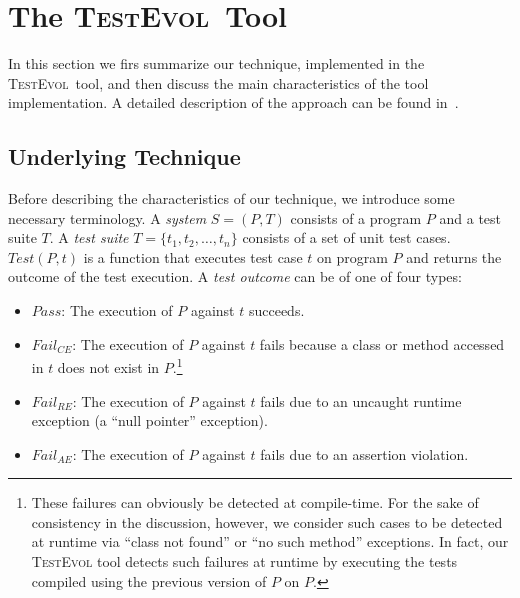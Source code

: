 \documentclass[conference]{IEEEtran}
\def\denseitems{
  \itemsep1pt plus1pt minus1pt
  \parsep0pt plus0pt
  \parskip0pt\topsep0pt}
\newcommand{\mt}{\mathit}
\newcommand{\pass}{\mt{Pass}}
\newcommand{\failce}{\mt{Fail}_{CE}}
\newcommand{\failre}{\mt{Fail}_{RE}}
\newcommand{\failae}{\mt{Fail}_{AE}}
\newcommand{\testfunc}[2]{\mt{Test(#1, #2)}}
\newcommand{\tool}{\textsc{TestEvol}\xspace}
\begin{document}
\section{The \tool\ Tool}
\label{sec:test-evolution}

In this section we firs summarize our technique, implemented in the
\tool\ tool, and then discuss the main characteristics of the tool
implementation. A detailed description of the approach can be found
in~\cite{pinto12}.

\subsection{Underlying Technique}

Before describing the characteristics of our technique, we introduce
some necessary terminology.  A \textit{system} $S = (P, T)$ consists
of a program $P$ and a test suite $T$.  A \textit{test suite} $T =
\{t_1, t_2, \ldots, t_n\}$ consists of a set of unit test cases.
$\testfunc{P}{t}$ is a function that executes test case $t$ on program
$P$ and returns the outcome of the test execution.  A \textit{test
  outcome} can be of one of four types:

\begin{itemize}\denseitems

\item $\pass$: The execution of $P$ against $t$ succeeds.

\item $\failce$: The execution of $P$ against $t$ fails because a
  class or method accessed in $t$ does not exist in
  $P$.\footnote{\small These failures can obviously be detected at
    compile-time. For the sake of consistency in the discussion,
    however, we consider such cases to be detected at runtime via
    ``class not found'' or ``no such method'' exceptions. In fact, our
    \tool{} tool detects such failures at runtime by executing the
    tests compiled using the previous version of $P$ on $P$.}

\item $\failre$: The execution of $P$ against $t$ fails due to an
  uncaught runtime exception (\eg a ``null pointer'' exception).

\item $\failae$: The execution of $P$ against $t$ fails due to an
  assertion violation.

\end{itemize}
\end{document}

